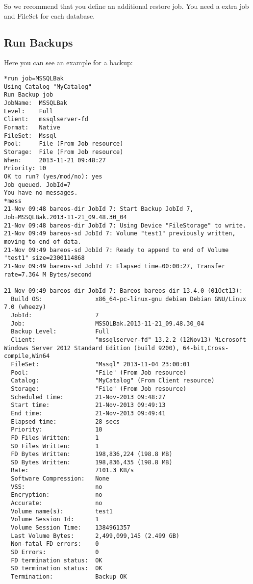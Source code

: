 So we recommend that you define an additional restore job. You need a extra job and FileSet for each database.

\subsection{Run Backups}
\label{filesetconfig}

Here you can see an example for a backup:

\footnotesize
\begin{verbatim}
*run job=MSSQLBak
Using Catalog "MyCatalog"
Run Backup job
JobName:  MSSQLBak
Level:    Full
Client:   mssqlserver-fd
Format:   Native
FileSet:  Mssql
Pool:     File (From Job resource)
Storage:  File (From Job resource)
When:     2013-11-21 09:48:27
Priority: 10
OK to run? (yes/mod/no): yes
Job queued. JobId=7
You have no messages.
*mess
21-Nov 09:48 bareos-dir JobId 7: Start Backup JobId 7, Job=MSSQLBak.2013-11-21_09.48.30_04
21-Nov 09:48 bareos-dir JobId 7: Using Device "FileStorage" to write.
21-Nov 09:49 bareos-sd JobId 7: Volume "test1" previously written, moving to end of data.
21-Nov 09:49 bareos-sd JobId 7: Ready to append to end of Volume "test1" size=2300114868
21-Nov 09:49 bareos-sd JobId 7: Elapsed time=00:00:27, Transfer rate=7.364 M Bytes/second

21-Nov 09:49 bareos-dir JobId 7: Bareos bareos-dir 13.4.0 (01Oct13):
  Build OS:               x86_64-pc-linux-gnu debian Debian GNU/Linux 7.0 (wheezy)
  JobId:                  7
  Job:                    MSSQLBak.2013-11-21_09.48.30_04
  Backup Level:           Full
  Client:                 "mssqlserver-fd" 13.2.2 (12Nov13) Microsoft Windows Server 2012 Standard Edition (build 9200), 64-bit,Cross-compile,Win64
  FileSet:                "Mssql" 2013-11-04 23:00:01
  Pool:                   "File" (From Job resource)
  Catalog:                "MyCatalog" (From Client resource)
  Storage:                "File" (From Job resource)
  Scheduled time:         21-Nov-2013 09:48:27
  Start time:             21-Nov-2013 09:49:13
  End time:               21-Nov-2013 09:49:41
  Elapsed time:           28 secs
  Priority:               10
  FD Files Written:       1
  SD Files Written:       1
  FD Bytes Written:       198,836,224 (198.8 MB)
  SD Bytes Written:       198,836,435 (198.8 MB)
  Rate:                   7101.3 KB/s
  Software Compression:   None
  VSS:                    no
  Encryption:             no
  Accurate:               no
  Volume name(s):         test1
  Volume Session Id:      1
  Volume Session Time:    1384961357
  Last Volume Bytes:      2,499,099,145 (2.499 GB)
  Non-fatal FD errors:    0
  SD Errors:              0
  FD termination status:  OK
  SD termination status:  OK
  Termination:            Backup OK

\end{verbatim}
\normalsize


